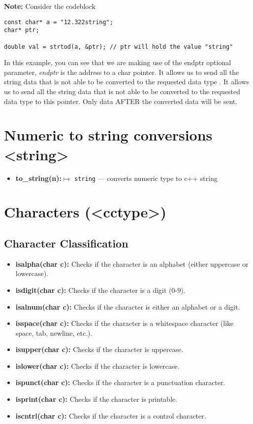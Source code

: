 \documentclass{report}
\begin{document}
    \textbf{Note:} Consider the codeblock
    \begin{verbatim}
const char* a = "12.322string";
char* ptr;

double val = strtod(a, &ptr); // ptr will hold the value "string"
    \end{verbatim}
    \bigbreak \noindent 
    In this example, you can see that we are making use of the endptr optional parameter, \textit{endptr} is the address to a char pointer. It allows us to send all the string data that is not able to be converted to the requested data type . It allows us to send all the string data that is not able to be converted to the requested data type to this pointer. Only data AFTER the converted data will be sent.
    
    \bigbreak \noindent 
    \section{\LARGE Numeric to string conversions <string>}
    \bigbreak \noindent 
    \begin{itemize}
        \item \textbf{to\_string(n):}$\mapsto$ \texttt{string} --- converts numeric type to c++ string
    \end{itemize}



    \bigbreak \noindent
    \section{\LARGE Characters (<cctype>)}
    \bigbreak \noindent 
    \subsection{Character Classification}
    \begin{itemize}
        \item \textbf{isalpha(char c):} Checks if the character is an alphabet (either uppercase or lowercase).
        \item \textbf{isdigit(char c):} Checks if the character is a digit (0-9).
        \item \textbf{isalnum(char c):} Checks if the character is either an alphabet or a digit.
        \item \textbf{isspace(char c):} Checks if the character is a whitespace character (like space, tab, newline, etc.).
        \item \textbf{isupper(char c):} Checks if the character is uppercase.
        \item \textbf{islower(char c):} Checks if the character is lowercase.
        \item \textbf{ispunct(char c):} Checks if the character is a punctuation character.
        \item \textbf{isprint(char c):} Checks if the character is printable.
        \item \textbf{iscntrl(char c):} Checks if the character is a control character.
    \end{itemize}
    \bigbreak \noindent 
\end{document}

